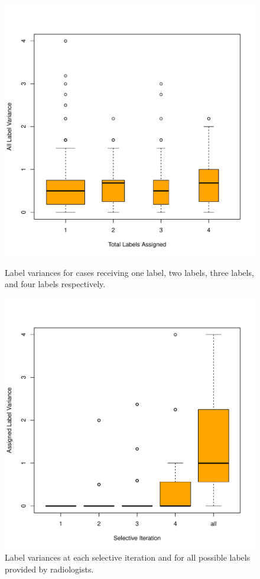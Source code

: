\documentclass[]{spie}
\begin{document}
\begin{figure}
\centering
\begin{minipage}{.45\textwidth}
  \centering
  \includegraphics[width=\linewidth]{allvar.pdf}
  \caption[Variance for cases by total labels added]
   { \label{fig: allvar}
Label variances for cases receiving one label, two labels, three labels, and four labels respectively.}
\end{minipage}
\hfill
\begin{minipage}{.45\textwidth}
  \centering
  \includegraphics[width=\linewidth]{setvar.pdf}
  \caption[Variance for label sets at selective iterations]
   { \label{fig: setvar}
Label variances at each selective iteration and for all possible labels provided by radiologists.}
\end{minipage}%
\end{figure}
\end{document}
